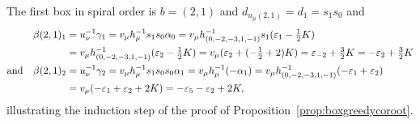 \documentclass[11pt]{article}
\theoremstyle{plain}
\theoremstyle{definition}
\newenvironment{example}
  {\pushQED{\qed}\exampleinner}
  {\popQED\endexampleinner}
\theoremstyle{remark}
\numberwithin{equation}{section}
\newcounter{r}
\newcounter{s}
\begin{document}
\begin{example}
The first box in spiral order is $b = (2,1)$ and $d_{u_\mu(2,1)} = d_1=s_1s_0$ and
\begin{align*}
\beta(2,1)_1 &= u_\nu^{-1}\gamma_1 = v_\mu h_\mu^{-1}s_1s_0\alpha_0 
= v_\mu h_{(0,-2,-3,1,-1)}^{-1} s_1(\varepsilon_1-\hbox{$\frac12$}K)
\\
&= v_\mu h_{(0,-2,-3,1,-1)}^{-1} (\varepsilon_2-\hbox{$\frac12$}K)
= v_\mu (\varepsilon_2+(-\hbox{$\frac12$}+2)K)
= \varepsilon_{-2}+\hbox{$\frac32$}K
= -\varepsilon_2+\hbox{$\frac32$}K
\\
\hbox{and}\quad
\beta(2,1)_2 &= u_\nu^{-1}\gamma_2 
= v_\mu h_\mu^{-1}s_1s_0s_0\alpha_1 
= v_\mu h_\mu^{-1}(-\alpha_1)
= v_\mu h_{(0,-2,-3,1,-1)}^{-1} (-\varepsilon_1+\varepsilon_2)
\\
&= v_\mu (-\varepsilon_1+\varepsilon_2+2K)
= -\varepsilon_5-\varepsilon_2+2K,
\end{align*}
illustrating the induction step of the proof of Proposition~\ref{prop:boxgreedycoroot}.
\end{example}
\end{document}
